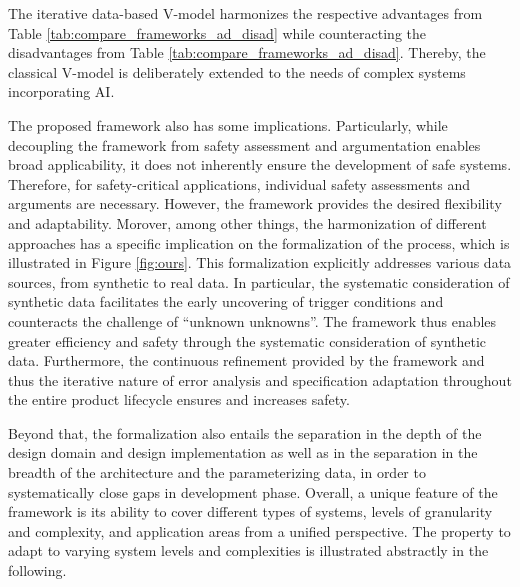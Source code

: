 The iterative data-based V-model harmonizes the respective advantages from Table \ref{tab:compare_frameworks_ad_disad} while counteracting the disadvantages from Table \ref{tab:compare_frameworks_ad_disad}. Thereby, the classical V-model is deliberately extended to the needs of complex systems incorporating AI. 

The proposed framework also has some implications. Particularly, while decoupling the framework from safety assessment and argumentation enables broad applicability, it does not inherently ensure the development of safe systems. Therefore, for safety-critical applications, individual safety assessments and arguments are necessary. However, the framework provides the desired flexibility and adaptability. Morover, among other things, the harmonization of different approaches has a specific implication on the formalization of the process, which is illustrated in Figure \ref{fig:ours}. This formalization explicitly addresses various data sources, from synthetic to real data. In particular, the systematic consideration of synthetic data facilitates the early uncovering of trigger conditions and counteracts the challenge of “unknown unknowns”. The framework thus enables greater efficiency and safety through the systematic consideration of synthetic data. Furthermore, the continuous refinement provided by the framework and thus the iterative nature of error analysis and specification adaptation throughout the entire product lifecycle ensures and increases safety.

Beyond that, the formalization also entails the separation in the depth of the design domain and design implementation as well as in the separation in the breadth of the architecture and the parameterizing data, in order to systematically close gaps in development phase. Overall, a unique feature of the framework is its ability to cover different types of systems, levels of granularity and complexity, and application areas from a unified perspective. The property to adapt to varying system levels and complexities is illustrated abstractly in the following.







